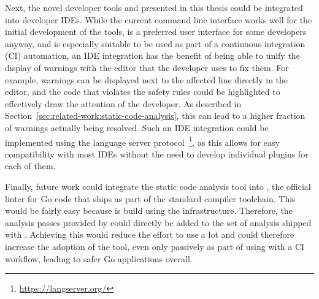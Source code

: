 Next, the novel developer tools \toolGeiger{} and \toolSafer{} presented in this thesis could be integrated into
developer \acrshort{IDE}s.
While the current command line interface works well for the initial development of the tools, is a preferred user
interface for some developers anyway, and is especially suitable to be used as part of a continuous integration
(\acrshort{CI}) automation, an \acrshort{IDE} integration has the benefit of being able to unify the display of warnings
with the editor that the developer uses to fix them.
For example, \toolSafer{} warnings can be displayed next to the affected line directly in the editor, and the code that
violates the safety rules could be highlighted to effectively draw the attention of the developer.
As described in Section~\ref{sec:related-work:static-code-analysis}, this can lead to a higher fraction of warnings
actually being resolved.
Such an \acrshort{IDE} integration could be implemented using the language server
protocol~\footnote{\url{https://langserver.org/}}, as this allows for easy compatibility with most \acrshort{IDE}s
without the need to develop individual plugins for each of them.

Finally, future work could integrate the static code analysis tool \toolSafer{} into \toolVet{}, the official linter
for Go code that ships as part of the standard compiler toolchain.
This would be fairly easy because \toolSafer{} is build using the \toolVet{} infrastructure.
Therefore, the analysis passes provided by \toolSafer{} could directly be added to the set of analysis shipped with
\toolVet{}.
Achieving this would reduce the effort to use \toolSafer{} a lot and could therefore increase the adoption of the tool,
even only passively as part of using \toolVet{} with a \acrshort{CI} workflow, leading to safer Go applications overall.
